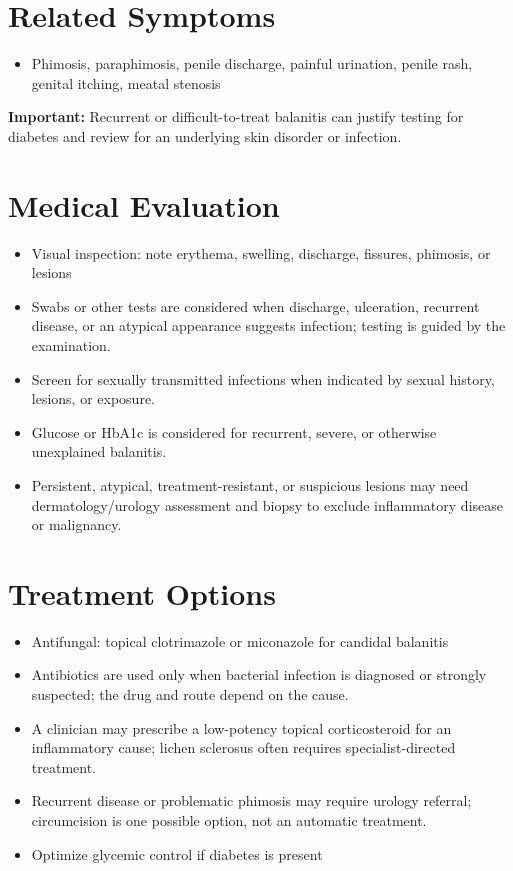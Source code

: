 \section*{Related Symptoms}
\begin{itemize}
 \item Phimosis, paraphimosis, penile discharge, painful urination, penile rash, genital itching, meatal stenosis
\end{itemize}
\textbf{Important:} Recurrent or difficult-to-treat balanitis can justify testing for diabetes and review for an underlying skin disorder or infection.

\section*{Medical Evaluation}
\begin{itemize}
 \item Visual inspection: note erythema, swelling, discharge, fissures, phimosis, or lesions
 \item Swabs or other tests are considered when discharge, ulceration, recurrent disease, or an atypical appearance suggests infection; testing is guided by the examination.
 \item Screen for sexually transmitted infections when indicated by sexual history, lesions, or exposure.
 \item Glucose or HbA1c is considered for recurrent, severe, or otherwise unexplained balanitis.
 \item Persistent, atypical, treatment-resistant, or suspicious lesions may need dermatology/urology assessment and biopsy to exclude inflammatory disease or malignancy.
\end{itemize}

\section*{Treatment Options}
\begin{itemize}
 \item Antifungal: topical clotrimazole or miconazole for candidal balanitis
 \item Antibiotics are used only when bacterial infection is diagnosed or strongly suspected; the drug and route depend on the cause.
 \item A clinician may prescribe a low-potency topical corticosteroid for an inflammatory cause; lichen sclerosus often requires specialist-directed treatment.
 \item Recurrent disease or problematic phimosis may require urology referral; circumcision is one possible option, not an automatic treatment.
 \item Optimize glycemic control if diabetes is present
\end{itemize}


